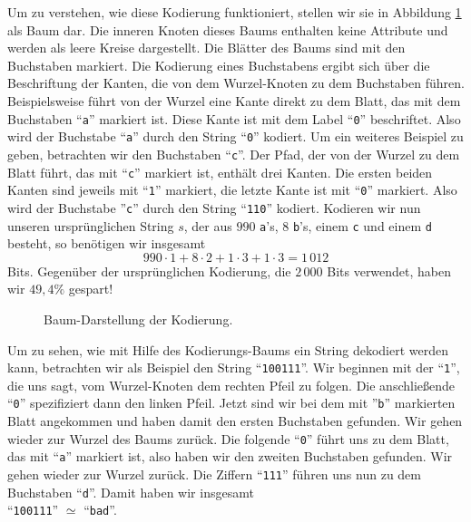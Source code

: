 Um zu verstehen, wie diese Kodierung funktioniert, stellen wir sie in
Abbildung \ref{fig:coding-tree} als Baum dar.  Die inneren 
Knoten dieses Baums enthalten keine Attribute und werden als leere Kreise dargestellt.
Die Bl\"atter des Baums sind mit den Buchstaben markiert.
Die Kodierung eines Buchstabens ergibt sich \"uber die Beschriftung der Kanten, die von dem
Wurzel-Knoten zu dem Buchstaben f\"uhren.  Beispielsweise f\"uhrt von der Wurzel eine
Kante direkt zu dem Blatt, das mit dem Buchstaben ``\texttt{a}'' markiert ist.  Diese
Kante ist mit dem Label ``\texttt{0}'' beschriftet.  Also wird der Buchstabe
``\texttt{a}'' durch den String ``\texttt{0}'' kodiert.  Um ein weiteres Beispiel zu
geben, betrachten wir den Buchstaben ``\texttt{c}''.   Der Pfad, der von der Wurzel zu dem
Blatt f\"uhrt, das mit ``\texttt{c}'' markiert ist, enth\"alt drei Kanten.  Die ersten beiden
Kanten sind jeweils mit ``\texttt{1}'' markiert, die letzte Kante ist mit ``\texttt{0}''
markiert.  Also wird der Buchstabe ''\texttt{c}'' durch den String ``\texttt{110}''
kodiert.  Kodieren wir nun unseren urspr\"unglichen String $s$, der aus $990$
\texttt{a}'s, $8$ \texttt{b}'s, einem \texttt{c} und einem \texttt{d} besteht, so
ben\"otigen wir insgesamt
\[ 990 \cdot 1 + 8 \cdot 2 + 1 \cdot 3 + 1 \cdot 3 = 1\,012 \]
Bits.  Gegen\"uber der urspr\"unglichen Kodierung, die $2\,000$ Bits verwendet, haben wir $49,4\%$
gespart!

\begin{figure}[!ht]
  \centering
  \caption{Baum-Darstellung der Kodierung.}
  \label{fig:coding-tree}
\end{figure}

Um zu sehen, wie mit Hilfe des Kodierungs-Baums ein String dekodiert werden kann,
betrachten wir als Beispiel den String ``\texttt{100111}''.  Wir beginnen mit der
``\texttt{1}'', die uns sagt, vom Wurzel-Knoten dem rechten Pfeil zu folgen.  Die
anschlie{\ss}ende ``\texttt{0}'' spezifiziert dann den linken Pfeil.  Jetzt sind wir bei dem
mit ''\texttt{b}'' markierten Blatt angekommen und haben damit den ersten Buchstaben
gefunden.  Wir gehen wieder zur Wurzel des Baums zur\"uck. Die folgende ``\texttt{0}'' f\"uhrt
uns zu dem Blatt, das mit ``\texttt{a}'' markiert ist, also haben wir den zweiten
Buchstaben gefunden. Wir gehen wieder zur Wurzel zur\"uck.  Die Ziffern ``\texttt{111}''
f\"uhren uns nun zu dem Buchstaben ``\texttt{d}''.  Damit haben wir insgesamt
\\[0.2cm]
\hspace*{1.3cm}
``\texttt{100111}'' $\simeq$ ``\texttt{bad}''.


